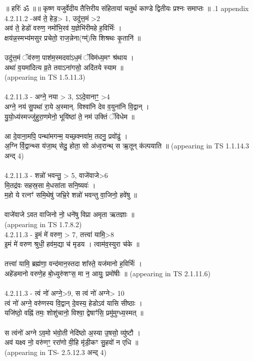 \documentclass[17pt]{extarticle}
\begin{document}
        
        ॥ हरिः॑ ॐ ॥॥ कृष्ण यजुर्वेदीय तैत्तिरीय संहितायां चतुर्थ काण्डे द्वितीयः प्रश्नः समाप्तः ॥ \newline
        .1   appendix\\4.2.11.2 -अव॑ ते॒ हेड॒> 1, उदु॑त्त॒मं >2 \\अव॑ ते॒ हेडो॑ वरुण॒ नमो॑भि॒रव॑ य॒ज्ञेभि॑रीमहे ह॒विर्भिः॑ । \\क्षय॑न्न॒स्मभ्य॑मसुर प्रचेतो॒ राज॒न्नेना(ग्म्॑)सि शिश्रथः कृ॒तानि॑ ॥ \\\\उदु॑त्त॒मं ॅव॑रुण॒ पाश॑म॒स्मदवा॑ऽध॒मं ॅविम॑ध्य॒मꣳ श्र॑थाय । \\अथा॑ व॒यमा॑दित्य व्र॒ते तवाऽना॑गसो॒ अदि॑तये स्याम ॥\\(appearing in TS 1.5.11.3)\\\\4.2.11.3 - अग्ने॒ नया > 3, ऽऽदे॒वानाꣳ॒॒ >4\\अग्ने॒ नय॑ सु॒पथा॑ रा॒ये अ॒स्मान्. विश्वा॑नि देव व॒युना॑नि वि॒द्वान् । \\यु॒यो॒ध्य॑स्मज्जु॑हुरा॒णमेनो॒ भूयि॑ष्ठां ते॒ नम॑ उक्तिं ॅविधेम ॥\\\\आ दे॒वाना॒मपि॒ पन्था॑मगन्म॒ यच्छ॒क्नवा॑म॒ तदनु॒ प्रवो॑ढुं । \\अ॒ग्नि र्वि॒द्वान्थ्स य॑जा॒थ् सेदु॒ होता॒ सो अ॑ध्व॒रान्थ् स ऋ॒तून् क॑ल्पयाति ॥ (appearing in TS 1.1.14.3 अन्द् 4)\\\\4.2.11.3 - शन्नो॑ भवन्तु॒ > 5, वाजे॑वाजे>6 \\मि॒तद्र॑वः सहस्र॒सा मे॒धसा॑ता सनि॒ष्यवः॑ । \\म॒हो ये रत्नꣳ॑ समि॒थेषु॑ जभ्रि॒रे शन्नो॑ भवन्तु वा॒जिनो॒ हवे॑षु ॥\\\\वाजे॑वाजे ऽवत वाजिनो नो॒ धने॑षु विप्रा अमृता ऋतज्ञाः ॥\\(appearing in TS 1.7.8.2)\\4.2.11.3 - इ॒मं मे॑ वरुण॒ > 7, तत्त्वा॑ यामि॒>8\\इ॒मं मे॑ वरुण श्रुधी॒ हव॑म॒द्या च॑ मृडय । त्वाम॑व॒स्युरा च॑के ॥ \\\\तत्त्वा॑ यामि॒ ब्रह्म॑णा॒ वन्द॑मान॒स्तदा शा᳚स्ते॒ यज॑मानो ह॒विर्भिः॑ । \\अहे॑डमानो वरुणे॒ह बो॒ध्युरु॑शꣳस॒ मा न॒ आयुः॒ प्रमो॑षीः ॥ (appearing in TS 2.1.11.6)\\\\4.2.11.3 - त्वं नो॑ अग्ने॒>9, स त्वं नो॑ अग्ने> 10 \\त्वं नो॑ अग्ने॒ वरु॑णस्य वि॒द्वान् दे॒वस्य॒ हेडोऽव॑ यासि सीष्ठाः । \\यजि॑ष्ठो॒ वह्नि॑ तमः॒ शोशु॑चानो॒ विश्वा॒ द्वेषाꣳ॑सि॒ प्रमु॑मुग्ध्य॒स्मत् ॥ \\\\स त्वंनो॑ अग्ने ऽव॒मो भ॑वो॒ती नेदि॑ष्ठो अ॒स्या उ॒षसो॒ व्यु॑ष्टौ । \\अव॑ यक्ष्व नो॒ वरु॑णꣳ॒॒ ररा॑णो वी॒हि मृ॑डी॒कꣳ सु॒हवो॑ न एधि ॥\\(appearing in TS- 2.5.12.3 अन्द् 4)\\
                \pagebreak
        
\end{document}
